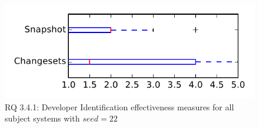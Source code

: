 
\begin{figure}
\centering
\includegraphics[height=0.4\textheight]{figures/dit_seed/rq1_tiny_22}
\caption{RQ 3.4.1: Developer Identification effectiveness measures for all subject systems with $seed=22$}
\label{fig:dit_seed:rq1:tiny}
\end{figure}

